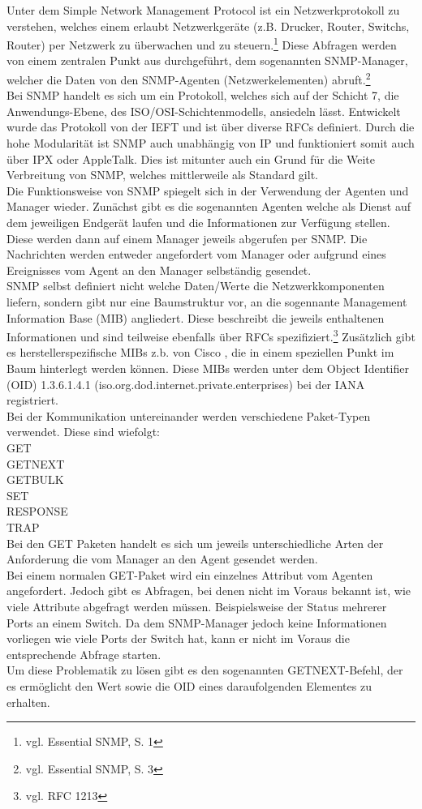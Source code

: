 Unter dem Simple Network Management Protocol ist ein Netzwerkprotokoll zu verstehen, welches einem erlaubt Netzwerkgeräte (z.B. Drucker, Router, Switchs, Router) per Netzwerk zu überwachen und zu steuern.\footnote{vgl. Essential SNMP, S. 1}
Diese Abfragen werden von einem zentralen Punkt aus durchgeführt, dem sogenannten SNMP-Manager, welcher die Daten von den SNMP-Agenten (Netzwerkelementen) abruft.\footnote{vgl. Essential SNMP, S. 3}\\
Bei SNMP handelt es sich um ein Protokoll, welches sich auf der Schicht 7, die Anwendungs-Ebene, des ISO/OSI-Schichtenmodells, ansiedeln lässt.
Entwickelt wurde das Protokoll von der IEFT und ist über diverse RFCs definiert.
Durch die hohe Modularität ist SNMP auch unabhängig von IP und funktioniert somit auch über IPX oder AppleTalk. Dies ist mitunter auch ein Grund für die Weite Verbreitung von SNMP, welches mittlerweile als Standard gilt.\\
Die Funktionsweise von  SNMP spiegelt sich in der Verwendung der Agenten und Manager wieder.
Zunächst gibt es die sogenannten Agenten welche als Dienst auf dem jeweiligen Endgerät laufen und die Informationen zur Verfügung stellen. Diese werden dann auf einem Manager jeweils abgerufen per SNMP. Die Nachrichten werden entweder angefordert vom Manager oder aufgrund eines Ereignisses vom Agent an den Manager selbständig gesendet.\\
SNMP selbst definiert nicht welche Daten/Werte die Netzwerkkomponenten liefern, sondern gibt nur eine Baumstruktur vor, an die sogennante Management Information Base (MIB) angliedert.
Diese beschreibt die jeweils enthaltenen Informationen und sind teilweise ebenfalls über RFCs spezifiziert.\footnote{vgl. RFC 1213} Zusätzlich gibt es herstellerspezifische MIBs z.b. von Cisco , die in einem speziellen Punkt im Baum hinterlegt werden können. Diese MIBs werden unter dem  Object Identifier (OID) 1.3.6.1.4.1 (iso.org.dod.internet.private.enterprises) bei der IANA registriert.\\
Bei der Kommunikation untereinander werden verschiedene Paket-Typen verwendet.
Diese sind wiefolgt:\\
GET\\
GETNEXT\\
GETBULK\\
SET\\
RESPONSE\\
TRAP\\


Bei den GET Paketen handelt es sich um jeweils unterschiedliche Arten der Anforderung die vom Manager an den Agent gesendet werden.\\
Bei einem normalen GET-Paket wird ein einzelnes Attribut vom Agenten angefordert. Jedoch gibt es Abfragen, bei denen nicht im Voraus bekannt ist, wie viele Attribute abgefragt werden müssen. Beispielsweise der Status mehrerer Ports an einem Switch. Da dem SNMP-Manager jedoch keine Informationen vorliegen wie viele Ports der Switch hat, kann er nicht im Voraus die entsprechende Abfrage starten.\\
Um diese Problematik zu lösen gibt es den sogenannten GETNEXT-Befehl, der es ermöglicht den Wert sowie die OID eines daraufolgenden Elementes zu erhalten.\\

